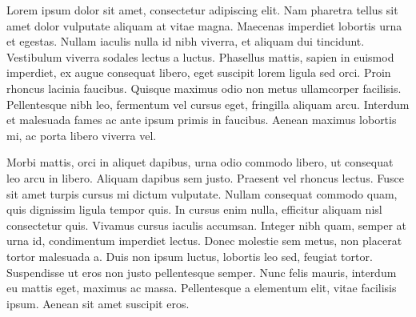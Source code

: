 Lorem ipsum dolor sit amet, consectetur adipiscing elit. Nam pharetra tellus sit amet dolor vulputate aliquam at vitae magna. Maecenas imperdiet lobortis urna et egestas. Nullam iaculis nulla id nibh viverra, et aliquam dui tincidunt. Vestibulum viverra sodales lectus a luctus. Phasellus mattis, sapien in euismod imperdiet, ex augue consequat libero, eget suscipit lorem ligula sed orci. Proin rhoncus lacinia faucibus. Quisque maximus odio non metus ullamcorper facilisis. Pellentesque nibh leo, fermentum vel cursus eget, fringilla aliquam arcu. Interdum et malesuada fames ac ante ipsum primis in faucibus. Aenean maximus lobortis mi, ac porta libero viverra vel.

Morbi mattis, orci in aliquet dapibus, urna odio commodo libero, ut consequat leo arcu in libero. Aliquam dapibus sem justo. Praesent vel rhoncus lectus. Fusce sit amet turpis cursus mi dictum vulputate. Nullam consequat commodo quam, quis dignissim ligula tempor quis. In cursus enim nulla, efficitur aliquam nisl consectetur quis. Vivamus cursus iaculis accumsan. Integer nibh quam, semper at urna id, condimentum imperdiet lectus. Donec molestie sem metus, non placerat tortor malesuada a. Duis non ipsum luctus, lobortis leo sed, feugiat tortor. Suspendisse ut eros non justo pellentesque semper. Nunc felis mauris, interdum eu mattis eget, maximus ac massa. Pellentesque a elementum elit, vitae facilisis ipsum. Aenean sit amet suscipit eros. 